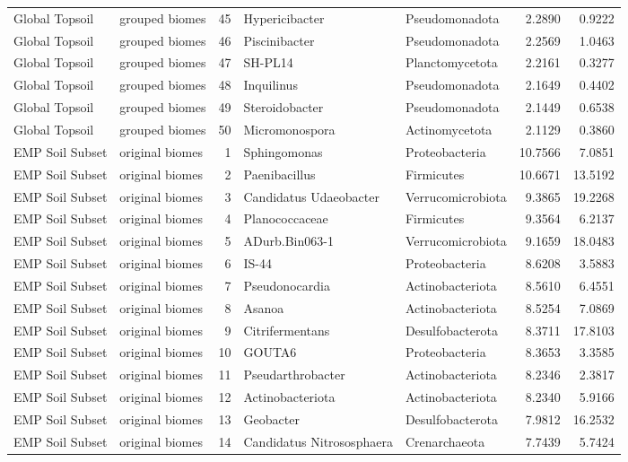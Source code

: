 \documentclass[12pt, oneside]{report}
\begin{document}
\begin{center}
\begin{longtable}{llrp{2.7cm}p{2.2cm}rr}
Global Topsoil & grouped biomes & 45 & Hypericibacter & Pseudomonadota & 2.2890 & 0.9222 \\
Global Topsoil & grouped biomes & 46 & Piscinibacter & Pseudomonadota & 2.2569 & 1.0463 \\
Global Topsoil & grouped biomes & 47 & SH-PL14 & Planctomycetota & 2.2161 & 0.3277 \\
Global Topsoil & grouped biomes & 48 & Inquilinus & Pseudomonadota & 2.1649 & 0.4402 \\
Global Topsoil & grouped biomes & 49 & Steroidobacter & Pseudomonadota & 2.1449 & 0.6538 \\
Global Topsoil & grouped biomes & 50 & Micromonospora & Actinomycetota & 2.1129 & 0.3860 \\
EMP Soil Subset & original biomes & 1 & Sphingomonas & Proteobacteria & 10.7566 & 7.0851 \\
EMP Soil Subset & original biomes & 2 & Paenibacillus & Firmicutes & 10.6671 & 13.5192 \\
EMP Soil Subset & original biomes & 3 & Candidatus Udaeobacter & Verrucomicrobiota & 9.3865 & 19.2268 \\
EMP Soil Subset & original biomes & 4 & Planococcaceae & Firmicutes & 9.3564 & 6.2137 \\
EMP Soil Subset & original biomes & 5 & ADurb.Bin063-1 & Verrucomicrobiota & 9.1659 & 18.0483 \\
EMP Soil Subset & original biomes & 6 & IS-44 & Proteobacteria & 8.6208 & 3.5883 \\
EMP Soil Subset & original biomes & 7 & Pseudonocardia & Actinobacteriota & 8.5610 & 6.4551 \\
EMP Soil Subset & original biomes & 8 & Asanoa & Actinobacteriota & 8.5254 & 7.0869 \\
EMP Soil Subset & original biomes & 9 & Citrifermentans & Desulfobacterota & 8.3711 & 17.8103 \\
EMP Soil Subset & original biomes & 10 & GOUTA6 & Proteobacteria & 8.3653 & 3.3585 \\
EMP Soil Subset & original biomes & 11 & Pseudarthrobacter & Actinobacteriota & 8.2346 & 2.3817 \\
EMP Soil Subset & original biomes & 12 & Actinobacteriota & Actinobacteriota & 8.2340 & 5.9166 \\
EMP Soil Subset & original biomes & 13 & Geobacter & Desulfobacterota & 7.9812 & 16.2532 \\
EMP Soil Subset & original biomes & 14 & Candidatus Nitrososphaera & Crenarchaeota & 7.7439 & 5.7424 \\

\end{longtable}
\end{center}
\end{document}
